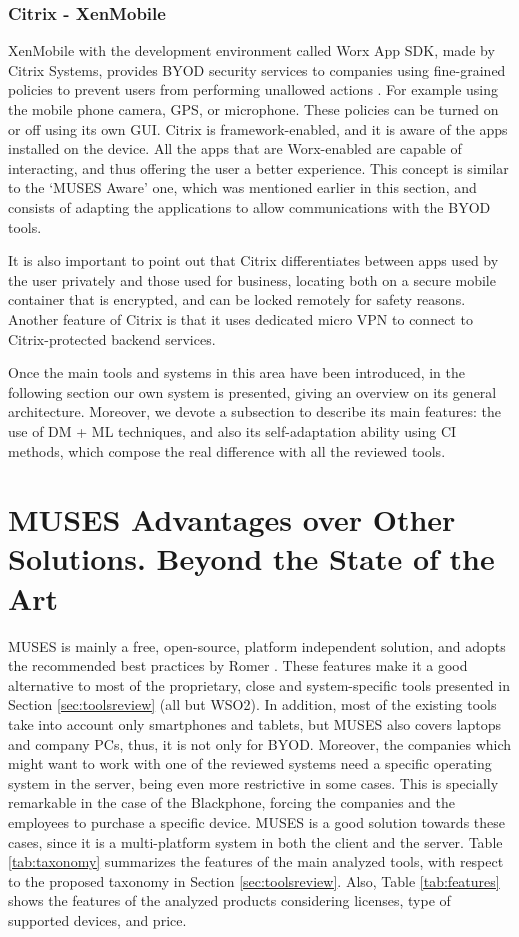 \subsubsection{Citrix - XenMobile}

XenMobile with the development environment called Worx App SDK, made by Citrix Systems, provides BYOD security services to companies using fine-grained policies to prevent users from performing unallowed actions \cite{WorxSDK}. For example using the mobile phone camera, GPS, or microphone. These policies can be turned on or off using its own GUI. Citrix is framework-enabled, and it is aware of the apps installed on the device. All the apps that are Worx-enabled are capable of interacting, and thus offering the user a better experience. This concept is similar to the `MUSES Aware' one, which was mentioned earlier in this section, and consists of adapting the applications to allow communications with the BYOD tools.

It is also important to point out that Citrix differentiates between apps used by the user privately and those used for business, locating both on a secure mobile container that is encrypted, and can be locked remotely for safety reasons. Another feature of Citrix is that it uses dedicated micro VPN to connect to Citrix-protected backend services.

Once the main tools and systems in this area have been introduced, in the following section our own system is presented, giving an overview on its general architecture. Moreover, we devote a subsection to describe its main features: the use of DM + ML techniques, and also its self-adaptation ability using CI methods, which compose the real difference with all the reviewed tools. 

\section{MUSES Advantages over Other Solutions. Beyond the State of the Art}
\label{sec:comparison}

MUSES is mainly a free, open-source, platform independent solution, and adopts the recommended best practices by Romer \cite{Romer14BestPractices}. These features make it a good alternative to most of the proprietary, close and system-specific tools presented in Section \ref{sec:toolsreview} (all but WSO2). In addition, most of the existing tools take into account only smartphones and tablets, but MUSES also covers laptops and company PCs, thus, it is not only for BYOD. Moreover, the companies which might want to work with one of the reviewed systems need a specific operating system in the server, being even more restrictive in some cases. This is specially remarkable in the case of the Blackphone, forcing the companies and the employees to purchase a specific device. MUSES is a good solution towards these cases, since it is a multi-platform system in both the client and the server. 
Table \ref{tab:taxonomy} summarizes the features of the main analyzed tools, with respect to the proposed taxonomy in Section \ref{sec:toolsreview}. Also, Table \ref{tab:features} shows the features of the analyzed products considering licenses, type of supported devices, and price.


